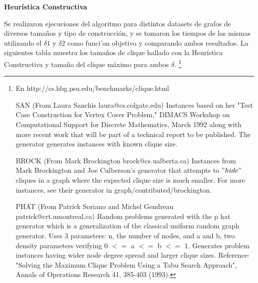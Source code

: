 \textbf{Heurística Constructiva}

Se realizaron ejecuciones del algoritmo para distintos datasets de grafos de diversos tamaños y tipo de construcción, y se tomaron los tiempos de las mismas utilizando el $\delta1$ y $\delta2$ como funci'on objetivo y comparando ambos resultados.
La siguientes tabla muestra los tamaños de clique hallado con la Heurística Constructiva y tamaño del clique máximo para ambos $\delta$.
\footnote{
En http://cs.hbg.psu.edu/benchmarks/clique.html	

SAN (From Laura Sanchis laura@cs.colgate.edu) Instances based on her "Test Case Construction for Vertex Cover Problem," DIMACS Workshop on Computational Support for Discrete Mathematics, March 1992 along with more recent work that will be part of a technical report to be published. The generator generates instances with known clique size.

BROCK (From Mark Brockington brock@cs.ualberta.ca) Instances from Mark Brockington and Joe Culberson's generator that attempts to $"hide"$ cliques in a graph where the expected clique size is much smaller. For more instances, see their generator in graph/contributed/brockington.

PHAT (From Patrick Soriano and Michel Gendreau patrick@crt.umontreal.ca) Random problems generated with the p hat generator which is a generalization of the classical uniform random graph generator. Uses 3 parameters: n, the number of nodes, and a and b, two density parameters verifying 0 $<=$ a $<=$ b $<=$ 1. Generates problem instances having wider node degree spread and larger clique sizes. Reference: "Solving the Maximum Clique Problem Using a Tabu Search Approach", Annals of Operations Research 41, 385-403 (1993).
}

